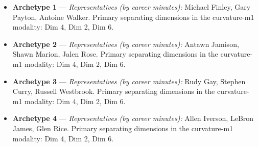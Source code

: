 \begin{itemize}
\item \textbf{Archetype 1} --- \emph{Representatives (by career minutes):} Michael Finley, Gary Payton, Antoine Walker. Primary separating dimensions in the curvature-m1 modality: Dim 4, Dim 2, Dim 6.
\item \textbf{Archetype 2} --- \emph{Representatives (by career minutes):} Antawn Jamison, Shawn Marion, Jalen Rose. Primary separating dimensions in the curvature-m1 modality: Dim 4, Dim 2, Dim 6.
\item \textbf{Archetype 3} --- \emph{Representatives (by career minutes):} Rudy Gay, Stephen Curry, Russell Westbrook. Primary separating dimensions in the curvature-m1 modality: Dim 4, Dim 2, Dim 6.
\item \textbf{Archetype 4} --- \emph{Representatives (by career minutes):} Allen Iverson, LeBron James, Glen Rice. Primary separating dimensions in the curvature-m1 modality: Dim 4, Dim 2, Dim 6.
\end{itemize}
